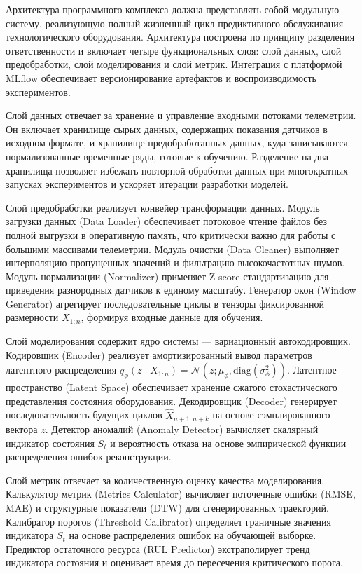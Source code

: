 \documentclass[14pt, a4paper, oneside]{extreport}
\begin{document}
Архитектура программного комплекса должна представлять собой модульную систему, реализующую полный жизненный цикл предиктивного обслуживания технологического оборудования. Архитектура построена по принципу разделения ответственности и включает четыре функциональных слоя: слой данных, слой предобработки, слой моделирования и слой метрик. Интеграция с платформой MLflow обеспечивает версионирование артефактов и воспроизводимость экспериментов.

Слой данных отвечает за хранение и управление входными потоками телеметрии. Он включает хранилище сырых данных, содержащих показания датчиков в исходном формате, и хранилище предобработанных данных, куда записываются нормализованные временные ряды, готовые к обучению. Разделение на два хранилища позволяет избежать повторной обработки данных при многократных запусках экспериментов и ускоряет итерации разработки моделей.

Слой предобработки реализует конвейер трансформации данных. Модуль загрузки данных (Data Loader) обеспечивает потоковое чтение файлов без полной выгрузки в оперативную память, что критически важно для работы с большими массивами телеметрии. Модуль очистки (Data Cleaner) выполняет интерполяцию пропущенных значений и фильтрацию высокочастотных шумов. Модуль нормализации (Normalizer) применяет Z-score стандартизацию для приведения разнородных датчиков к единому масштабу. Генератор окон (Window Generator) агрегирует последовательные циклы в тензоры фиксированной размерности $X_{1:n}$, формируя входные данные для обучения.

Слой моделирования содержит ядро системы — вариационный автокодировщик. Кодировщик (Encoder) реализует амортизированный вывод параметров латентного распределения $q_\phi(z \mid X_{1:n}) = \mathcal{N}(z; \mu_\phi, \text{diag}(\sigma^2_\phi))$. Латентное пространство (Latent Space) обеспечивает хранение сжатого стохастического представления состояния оборудования. Декодировщик (Decoder) генерирует последовательность будущих циклов $\hat{X}_{n+1:n+k}$ на основе сэмплированного вектора $z$. Детектор аномалий (Anomaly Detector) вычисляет скалярный индикатор состояния $S_t$ и вероятность отказа на основе эмпирической функции распределения ошибок реконструкции.

Слой метрик отвечает за количественную оценку качества моделирования. Калькулятор метрик (Metrics Calculator) вычисляет поточечные ошибки (RMSE, MAE) и структурные показатели (DTW) для сгенерированных траекторий. Калибратор порогов (Threshold Calibrator) определяет граничные значения индикатора $S_t$ на основе распределения ошибок на обучающей выборке. Предиктор остаточного ресурса (RUL Predictor) экстраполирует тренд индикатора состояния и оценивает время до пересечения критического порога.
\end{document}
